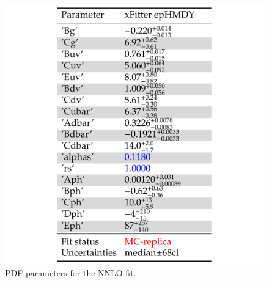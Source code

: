\begin{figure}
\includegraphics[width=14cm]{plots/parameters.pdf} 
\caption{PDF parameters for the NNLO fit.}
\label{par_scan}
\end{figure}

